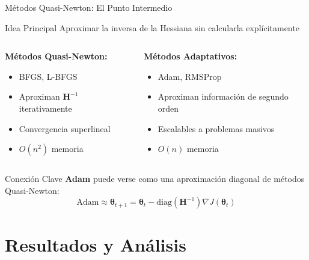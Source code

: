 \documentclass[10pt]{beamer}
\begin{document}
\begin{frame}{Métodos Quasi-Newton: El Punto Intermedio}
\begin{block}{Idea Principal}
Aproximar la inversa de la Hessiana sin calcularla explícitamente
\end{block}

\begin{columns}
\begin{column}{0.5\textwidth}
\textbf{Métodos Quasi-Newton:}
\begin{itemize}
\item BFGS, L-BFGS
\item Aproximan $\mathbf{H}^{-1}$ iterativamente
\item Convergencia superlineal
\item $O(n^2)$ memoria
\end{itemize}
\end{column}
\begin{column}{0.5\textwidth}
\textbf{Métodos Adaptativos:}
\begin{itemize}
\item Adam, RMSProp
\item Aproximan información de segundo orden
\item Escalables a problemas masivos
\item $O(n)$ memoria
\end{itemize}
\end{column}
\end{columns}

\begin{alertblock}{Conexión Clave}
\textbf{Adam} puede verse como una aproximación diagonal de métodos Quasi-Newton:
$$\text{Adam} \approx \boldsymbol{\theta}_{t+1} = \boldsymbol{\theta}_t - \text{diag}(\mathbf{H}^{-1}) \nabla J(\boldsymbol{\theta}_t)$$
\end{alertblock}
\end{frame}

\section{Resultados y Análisis}
\end{document}

